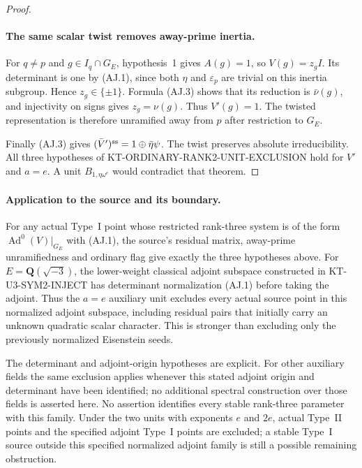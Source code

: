 \begin{proof}
\paragraph{The same scalar twist removes away-prime inertia.}
For $q\ne p$ and $g\in I_q\cap G_E$,
hypothesis~1 gives $A(g)=1$, so $V(g)=z_g I$.
Its determinant is one by (AJ.1), since both
$\eta$ and $\varepsilon_p$ are trivial on
this inertia subgroup.  Hence $z_g\in\{\pm1\}$.
Formula (AJ.3) shows that its reduction is
$\bar\nu(g)$, and injectivity on signs gives
$z_g=\nu(g)$.  Thus $V'(g)=1$.
The twisted representation is therefore
unramified away from $p$ after restriction
to $G_E$.

Finally (AJ.3) gives
$(\bar V')^{\rm ss}=1\oplus\bar\eta\psi$.
The twist preserves absolute irreducibility.
All three hypotheses of
KT-ORDINARY-RANK2-UNIT-EXCLUSION hold for
$V'$ and $a=e$.  A unit $B_{1,\eta\omega^e}$
would contradict that theorem.
\end{proof}

\paragraph{Application to the source and its boundary.}
For any actual Type~I point whose restricted
rank-three system is of the form
$\operatorname{Ad}^0(V)|_{G_E}$ with (AJ.1),
the source's residual matrix, away-prime
unramifiedness and ordinary flag give exactly
the three hypotheses above.  For
$E=\mathbf Q(\sqrt{-3})$, the lower-weight
classical adjoint subspace constructed in
KT-U3-SYM2-INJECT has determinant normalization
(AJ.1) before taking the adjoint.  Thus the
$a=e$ auxiliary unit excludes every actual
source point in this normalized adjoint
subspace, including residual pairs that
initially carry an unknown quadratic scalar
character.  This is stronger than excluding
only the previously normalized Eisenstein
seeds.

The determinant and adjoint-origin hypotheses
are explicit.  For other auxiliary fields the
same exclusion applies whenever this stated
adjoint origin and determinant have been
identified; no additional spectral construction
over those fields is asserted here.
No assertion identifies every
stable rank-three parameter with this family.
Under the two units with exponents $e$ and
$2e$, actual Type~II points and the specified
adjoint Type~I points are excluded; a
stable Type~I source outside this specified
normalized adjoint family is still a possible
remaining obstruction.
